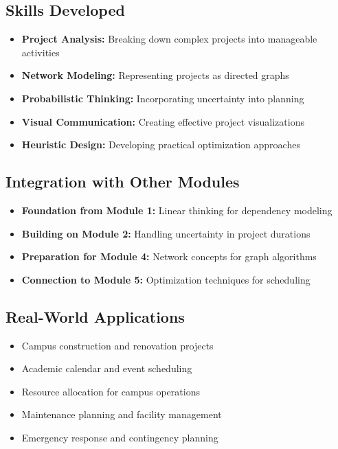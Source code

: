 \documentclass[
  letterpaper,
  DIV=11,
  numbers=noendperiod]{scrreprt}
\providecommand{\tightlist}{%
  \setlength{\itemsep}{0pt}\setlength{\parskip}{0pt}}
\begin{document}
\subsection{Skills Developed}\label{skills-developed}

\begin{itemize}
\tightlist
\item
  \textbf{Project Analysis:} Breaking down complex projects into
  manageable activities
\item
  \textbf{Network Modeling:} Representing projects as directed graphs
\item
  \textbf{Probabilistic Thinking:} Incorporating uncertainty into
  planning
\item
  \textbf{Visual Communication:} Creating effective project
  visualizations
\item
  \textbf{Heuristic Design:} Developing practical optimization
  approaches
\end{itemize}

\subsection{Integration with Other
Modules}\label{integration-with-other-modules}

\begin{itemize}
\tightlist
\item
  \textbf{Foundation from Module 1:} Linear thinking for dependency
  modeling
\item
  \textbf{Building on Module 2:} Handling uncertainty in project
  durations
\item
  \textbf{Preparation for Module 4:} Network concepts for graph
  algorithms
\item
  \textbf{Connection to Module 5:} Optimization techniques for
  scheduling
\end{itemize}

\subsection{Real-World Applications}\label{real-world-applications}

\begin{itemize}
\tightlist
\item
  Campus construction and renovation projects
\item
  Academic calendar and event scheduling
\item
  Resource allocation for campus operations
\item
  Maintenance planning and facility management
\item
  Emergency response and contingency planning
\end{itemize}
\end{document}
